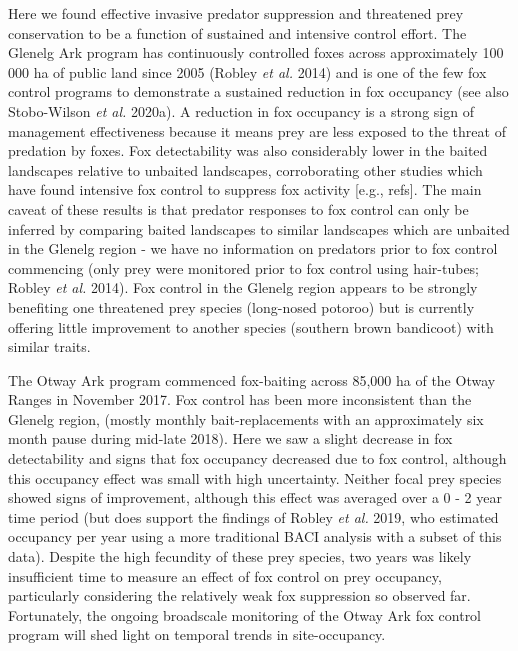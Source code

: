 \documentclass[11pt,a4paper,titlepage,twoside,openright]{style/unimelbthesis}
\begin{document}
\begin{mainmatter}
Here we found effective invasive predator suppression and threatened prey conservation to be a function of sustained and intensive control effort. The Glenelg Ark program has continuously controlled foxes across approximately 100 000 ha of public land since 2005 (Robley \emph{et al.} 2014) and is one of the few fox control programs to demonstrate a sustained reduction in fox occupancy (see also Stobo-Wilson \emph{et al.} 2020a). A reduction in fox occupancy is a strong sign of management effectiveness because it means prey are less exposed to the threat of predation by foxes. Fox detectability was also considerably lower in the baited landscapes relative to unbaited landscapes, corroborating other studies which have found intensive fox control to suppress fox activity {[}e.g., refs{]}. The main caveat of these results is that predator responses to fox control can only be inferred by comparing baited landscapes to similar landscapes which are unbaited in the Glenelg region - we have no information on predators prior to fox control commencing (only prey were monitored prior to fox control using hair-tubes; Robley \emph{et al.} 2014). Fox control in the Glenelg region appears to be strongly benefiting one threatened prey species (long-nosed potoroo) but is currently offering little improvement to another species (southern brown bandicoot) with similar traits.

The Otway Ark program commenced fox-baiting across 85,000 ha of the Otway Ranges in November 2017. Fox control has been more inconsistent than the Glenelg region, (mostly monthly bait-replacements with an approximately six month pause during mid-late 2018). Here we saw a slight decrease in fox detectability and signs that fox occupancy decreased due to fox control, although this occupancy effect was small with high uncertainty. Neither focal prey species showed signs of improvement, although this effect was averaged over a 0 - 2 year time period (but does support the findings of Robley \emph{et al.} 2019, who estimated occupancy per year using a more traditional BACI analysis with a subset of this data). Despite the high fecundity of these prey species, two years was likely insufficient time to measure an effect of fox control on prey occupancy, particularly considering the relatively weak fox suppression so observed far. Fortunately, the ongoing broadscale monitoring of the Otway Ark fox control program will shed light on temporal trends in site-occupancy.


\end{mainmatter}
\end{document}
